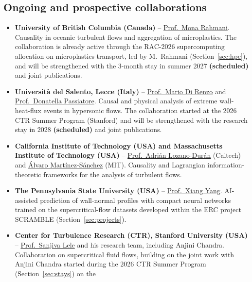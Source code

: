 \documentclass[11pt]{article}
\begin{document}
\subsection{Ongoing and prospective collaborations}\label{sec:collab}
\begin{itemize}
  \item \textbf{University of British Columbia (Canada)} --
  \href{https://chbe.ubc.ca/mona-rahmani/}{Prof.\ Mona Rahmani}. Causality in oceanic
  turbulent flows and aggregation of microplastics. The collaboration is already active
  through the RAC-2026 supercomputing allocation on microplastics transport, led by M.\ Rahmani
  (Section~\ref{sec:hpc}), and will be strengthened with the 3-month stay in summer 2027 \textbf{(scheduled)}
  and joint publications.
  \item \textbf{Universit\`a del Salento, Lecce (Italy)} --
  \href{https://www.unisalento.it/scheda-utente/-/people/mario.direnzo}{Prof.\ Mario Di Renzo}
  and \href{https://www.unisalento.it/scheda-utente/-/people/donatella.passiatore}{Prof.\ Donatella Passiatore}.
  Causal and physical analysis of extreme wall-heat-flux events in hypersonic flows. The
  collaboration started at the 2026 CTR Summer Program (Stanford) and will be strengthened
  with the research stay in 2028 \textbf{(scheduled)} and joint publications.
  \item \textbf{California Institute of Technology (USA) and Massachusetts Institute of
  Technology (USA)} --
  \href{https://www.eas.caltech.edu/people/adrian-lozano-duran}{Prof.\ Adri\'an
  Lozano-Dur\'an} (Caltech) and
  \href{https://sites.google.com/view/alvaro-martinez-sanchez/about-me}{\'Alvaro
  Mart\'inez-S\'anchez} (MIT). Causality and Lagrangian information-theoretic frameworks
  for the analysis of turbulent flows.
  \item \textbf{The Pennsylvania State University (USA)} --
  \href{https://www.me.psu.edu/department/directory-detail-g.aspx?q=xzy48}{Prof.\ Xiang
  Yang}. AI-assisted prediction of wall-normal profiles with compact neural networks
  trained on the supercritical-flow datasets developed within the ERC project SCRAMBLE
  (Section~\ref{sec:projects}).
  \item \textbf{Center for Turbulence Research (CTR), Stanford University (USA)} --
  \href{https://me.stanford.edu/people/sanjiva-lele}{Prof.\ Sanjiva Lele} and his research team,
  including Anjini Chandra. Collaboration on supercritical fluid flows, building on the joint work
  with Anjini Chandra started during the 2026 CTR Summer Program (Section~\ref{sec:stays}) on the

\end{itemize}
\end{document}
